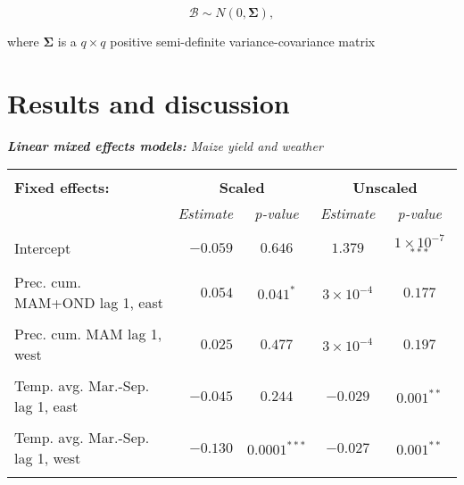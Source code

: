 \documentclass[a4paper,12pt]{article}
\begin{document}
\begin{equation}\label{ranefDist}
\mathscr{B} \sim \mathit{N}(0,\mathbf{\Sigma}),
\end{equation}

where $\mathbf{\Sigma}$ is a $q \times q$ positive semi-definite variance-covariance matrix

\FloatBarrier
	\section{Results and discussion}\label{Results}



{\centering
\begin{threeparttable}


\singlespacing
\caption{\textit{\textbf{Linear mixed effects models:} Maize yield and weather}}
\label{Peggy45} 
\centering
\begin{small}
\begin{tabular}{lrccc} 
\hline \vspace{-0.2cm} \\
  
  
  \multicolumn{1}{l}{\vspace{0.1cm}\textbf{Fixed effects:}}  &\multicolumn{2}{c}{\textbf{Scaled}}& \multicolumn{2}{c}{{\textbf{Unscaled\tnote{a}}}} \\
  
    \multicolumn{1}{l}{\vspace{0.1cm}}  &\textit{Estimate}&\textit{p-value}&\multicolumn{1}{c}{\textit{Estimate}}& \multicolumn{1}{c}{\textit{p-value}} \\
 \hline 
\hline
\\
\vspace{-0.2cm}Intercept&$-0.059$&$0.646$&$1.379$&$1\times10^{-7}$$^{***}$\\
  \\
\vspace{-0.2cm}Prec. cum. MAM+OND lag 1, east&$0.054$&$0.041^{*}$&$3\times10^{-4}$&$0.177$\\
  \\
  \vspace{-0.2cm}Prec. cum. MAM lag 1, west&$0.025$&$0.477$&$3\times10^{-4}$&$0.197$\\
  \\
  \vspace{-0.2cm}Temp. avg. Mar.-Sep. lag 1, east&$-0.045$&$0.244$&$-0.029$&$0.001^{**}$\\
  \\
    \vspace{-0.2cm}Temp. avg. Mar.-Sep. lag 1, west&$-0.130$&$0.0001^{***}$&$-0.027$&$0.001^{**}$\\
  \\
  

\end{tabular}
\end{small}
\end{threeparttable}}
\end{document}
